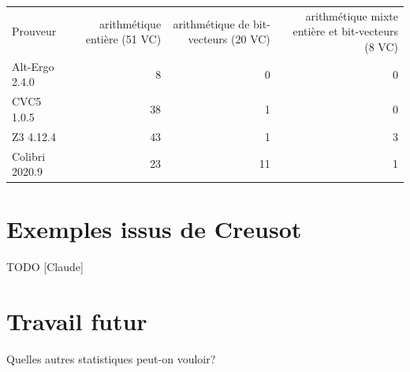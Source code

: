 \documentclass[a4paper,11pt]{article}
\begin{document}
\begin{center}
  \begin{tabular}{|l|r|r|r|}
  \rowcolor{gray!50} Prouveur
  & \multicolumn{1}{p{0.13\textwidth}|}{arithmétique entière (51 VC)}
  & \multicolumn{1}{p{0.13\textwidth}|}{arithmétique de bit-vecteurs (20 VC)}
  & \multicolumn{1}{p{0.13\textwidth}|}{arithmétique mixte entière et bit-vecteurs (8 VC)}
  \\
  Alt-Ergo 2.4.0                &  8 &  0 & 0  \\
  CVC5 1.0.5                    & 38 &  1 & 0 \\
  Z3 4.12.4                     & 43 &  1 & 3 \\
  Colibri 2020.9                & 23 & 11 & 1
\end{tabular}
\end{center}

\section{Exemples issus de Creusot}

TODO [Claude]

\section{Travail futur}

Quelles autres statistiques peut-on vouloir?
\end{document}
